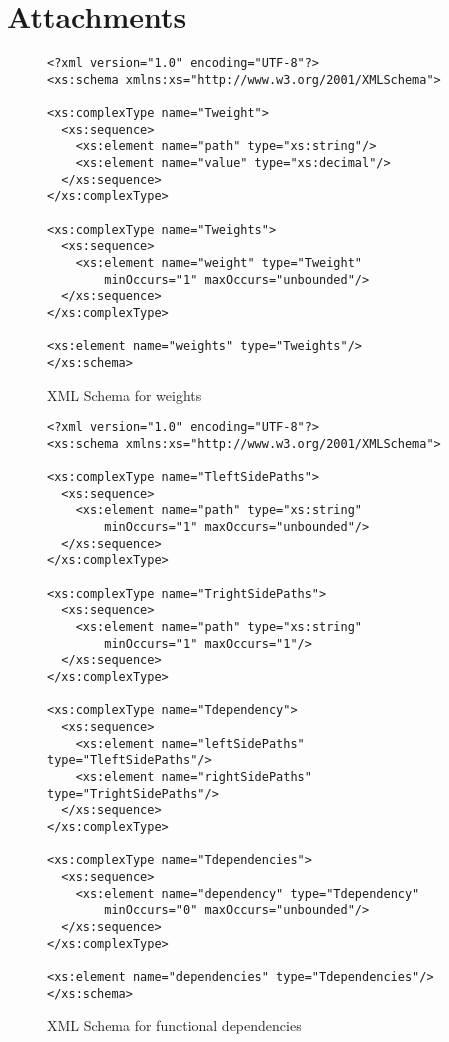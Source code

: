 \chapter{Attachments}

\begin{figure}[h]
\caption{XML Schema for weights}
\label{weightschema}
\begin{verbatim}
<?xml version="1.0" encoding="UTF-8"?>
<xs:schema xmlns:xs="http://www.w3.org/2001/XMLSchema">

<xs:complexType name="Tweight">
  <xs:sequence>
    <xs:element name="path" type="xs:string"/>
    <xs:element name="value" type="xs:decimal"/>
  </xs:sequence>
</xs:complexType>

<xs:complexType name="Tweights">
  <xs:sequence>
    <xs:element name="weight" type="Tweight"
        minOccurs="1" maxOccurs="unbounded"/>
  </xs:sequence>
</xs:complexType>

<xs:element name="weights" type="Tweights"/>
</xs:schema>
\end{verbatim}
\end{figure}

\begin{figure}[h]
\caption{XML Schema for functional dependencies}
\label{fdschema}

\begin{verbatim}
<?xml version="1.0" encoding="UTF-8"?>
<xs:schema xmlns:xs="http://www.w3.org/2001/XMLSchema">

<xs:complexType name="TleftSidePaths">
  <xs:sequence>
    <xs:element name="path" type="xs:string"
        minOccurs="1" maxOccurs="unbounded"/>
  </xs:sequence>
</xs:complexType>

<xs:complexType name="TrightSidePaths">
  <xs:sequence>
    <xs:element name="path" type="xs:string"
        minOccurs="1" maxOccurs="1"/>
  </xs:sequence>
</xs:complexType>

<xs:complexType name="Tdependency">
  <xs:sequence>
    <xs:element name="leftSidePaths" type="TleftSidePaths"/>
    <xs:element name="rightSidePaths" type="TrightSidePaths"/>
  </xs:sequence>
</xs:complexType>

<xs:complexType name="Tdependencies">
  <xs:sequence>
    <xs:element name="dependency" type="Tdependency"
        minOccurs="0" maxOccurs="unbounded"/>
  </xs:sequence>
</xs:complexType>

<xs:element name="dependencies" type="Tdependencies"/>
</xs:schema>
\end{verbatim}
\end{figure}
